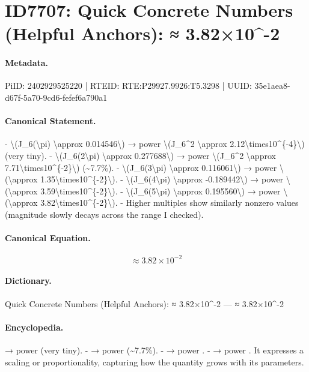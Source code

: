 \section*{ID7707: Quick Concrete Numbers (Helpful Anchors): ≈ 3.82×10\textasciicircum{}-2}
\paragraph{Metadata.}
PiID: 2402929525220 | RTEID: RTE:P29927.9926:T5.3298 | UUID: 35e1aea8-d67f-5a70-9cd6-fefef6a790a1

\paragraph{Canonical Statement.}
- \textbackslash{}(J\_6(\textbackslash{}pi) \textbackslash{}approx 0.014546\textbackslash{}) → power \textbackslash{}(J\_6\textasciicircum{}2 \textbackslash{}approx 2.12\textbackslash{}times10\textasciicircum{}\{-4\}\textbackslash{}) (very tiny). - \textbackslash{}(J\_6(2\textbackslash{}pi) \textbackslash{}approx 0.277688\textbackslash{}) → power \textbackslash{}(J\_6\textasciicircum{}2 \textbackslash{}approx 7.71\textbackslash{}times10\textasciicircum{}\{-2\}\textbackslash{}) (\textasciitilde{}7.7\%). - \textbackslash{}(J\_6(3\textbackslash{}pi) \textbackslash{}approx 0.116061\textbackslash{}) → power \textbackslash{}(\textbackslash{}approx 1.35\textbackslash{}times10\textasciicircum{}\{-2\}\textbackslash{}). - \textbackslash{}(J\_6(4\textbackslash{}pi) \textbackslash{}approx -0.189442\textbackslash{}) → power \textbackslash{}(\textbackslash{}approx 3.59\textbackslash{}times10\textasciicircum{}\{-2\}\textbackslash{}). - \textbackslash{}(J\_6(5\textbackslash{}pi) \textbackslash{}approx 0.195560\textbackslash{}) → power \textbackslash{}(\textbackslash{}approx 3.82\textbackslash{}times10\textasciicircum{}\{-2\}\textbackslash{}). - Higher multiples show similarly nonzero values (magnitude slowly decays across the range I checked).

\paragraph{Canonical Equation.}
\[
\approx 3.82\times10^{-2}
\]

\paragraph{Dictionary.}
Quick Concrete Numbers (Helpful Anchors): ≈ 3.82×10\textasciicircum{}-2 — ≈ 3.82×10\textasciicircum{}-2

\paragraph{Encyclopedia.}
→ power (very tiny). - → power (\textasciitilde{}7.7\%). - → power . - → power . It expresses a scaling or proportionality, capturing how the quantity grows with its parameters.
